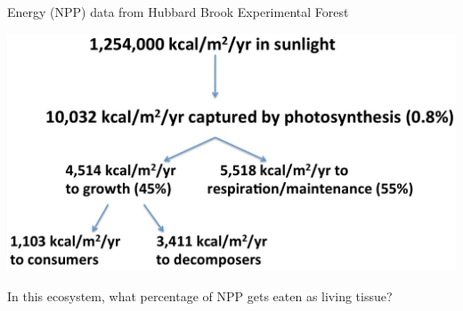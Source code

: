 \begin{frame}[t]
    \begin{adjustwidth}{-2em}{-1.5em}
        \vspace{-3mm}
        Energy (NPP) data from Hubbard Brook Experimental Forest

        \includegraphics[width=\linewidth]{energy-transfer-cascade.png}

        In this ecosystem, what percentage of NPP gets eaten as living tissue?
        

    \end{adjustwidth}
\end{frame}

